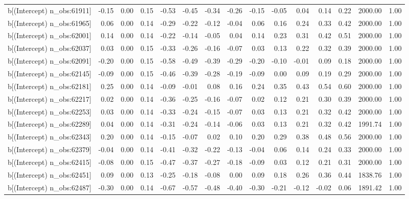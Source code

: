 \begin{table}[ht]
\begin{tabular}{rrrrrrrrrrrrrrr}
  b[(Intercept) n\_obs:61911] & -0.15 & 0.00 & 0.15 & -0.53 & -0.45 & -0.34 & -0.26 & -0.15 & -0.05 & 0.04 & 0.14 & 0.22 & 2000.00 & 1.00 \\ 
  b[(Intercept) n\_obs:61965] & 0.06 & 0.00 & 0.14 & -0.29 & -0.22 & -0.12 & -0.04 & 0.06 & 0.16 & 0.24 & 0.33 & 0.42 & 2000.00 & 1.00 \\ 
  b[(Intercept) n\_obs:62001] & 0.14 & 0.00 & 0.14 & -0.22 & -0.14 & -0.05 & 0.04 & 0.14 & 0.23 & 0.31 & 0.42 & 0.51 & 2000.00 & 1.00 \\ 
  b[(Intercept) n\_obs:62037] & 0.03 & 0.00 & 0.15 & -0.33 & -0.26 & -0.16 & -0.07 & 0.03 & 0.13 & 0.22 & 0.32 & 0.39 & 2000.00 & 1.00 \\ 
  b[(Intercept) n\_obs:62091] & -0.20 & 0.00 & 0.15 & -0.58 & -0.49 & -0.39 & -0.29 & -0.20 & -0.10 & -0.01 & 0.09 & 0.18 & 2000.00 & 1.00 \\ 
  b[(Intercept) n\_obs:62145] & -0.09 & 0.00 & 0.15 & -0.46 & -0.39 & -0.28 & -0.19 & -0.09 & 0.00 & 0.09 & 0.19 & 0.29 & 2000.00 & 1.00 \\ 
  b[(Intercept) n\_obs:62181] & 0.25 & 0.00 & 0.14 & -0.09 & -0.01 & 0.08 & 0.16 & 0.24 & 0.35 & 0.43 & 0.54 & 0.60 & 2000.00 & 1.00 \\ 
  b[(Intercept) n\_obs:62217] & 0.02 & 0.00 & 0.14 & -0.36 & -0.25 & -0.16 & -0.07 & 0.02 & 0.12 & 0.21 & 0.30 & 0.39 & 2000.00 & 1.00 \\ 
  b[(Intercept) n\_obs:62253] & 0.03 & 0.00 & 0.14 & -0.33 & -0.24 & -0.15 & -0.07 & 0.03 & 0.13 & 0.21 & 0.32 & 0.42 & 2000.00 & 1.00 \\ 
  b[(Intercept) n\_obs:62289] & 0.04 & 0.00 & 0.14 & -0.31 & -0.24 & -0.14 & -0.06 & 0.03 & 0.13 & 0.21 & 0.32 & 0.42 & 1991.74 & 1.00 \\ 
  b[(Intercept) n\_obs:62343] & 0.20 & 0.00 & 0.14 & -0.15 & -0.07 & 0.02 & 0.10 & 0.20 & 0.29 & 0.38 & 0.48 & 0.56 & 2000.00 & 1.00 \\ 
  b[(Intercept) n\_obs:62379] & -0.04 & 0.00 & 0.14 & -0.41 & -0.32 & -0.22 & -0.13 & -0.04 & 0.06 & 0.14 & 0.24 & 0.33 & 2000.00 & 1.00 \\ 
  b[(Intercept) n\_obs:62415] & -0.08 & 0.00 & 0.15 & -0.47 & -0.37 & -0.27 & -0.18 & -0.09 & 0.03 & 0.12 & 0.21 & 0.31 & 2000.00 & 1.00 \\ 
  b[(Intercept) n\_obs:62451] & 0.09 & 0.00 & 0.13 & -0.25 & -0.18 & -0.08 & 0.00 & 0.09 & 0.18 & 0.26 & 0.36 & 0.44 & 1838.76 & 1.00 \\ 
  b[(Intercept) n\_obs:62487] & -0.30 & 0.00 & 0.14 & -0.67 & -0.57 & -0.48 & -0.40 & -0.30 & -0.21 & -0.12 & -0.02 & 0.06 & 1891.42 & 1.00 \\ 

\end{tabular}
\end{table}
